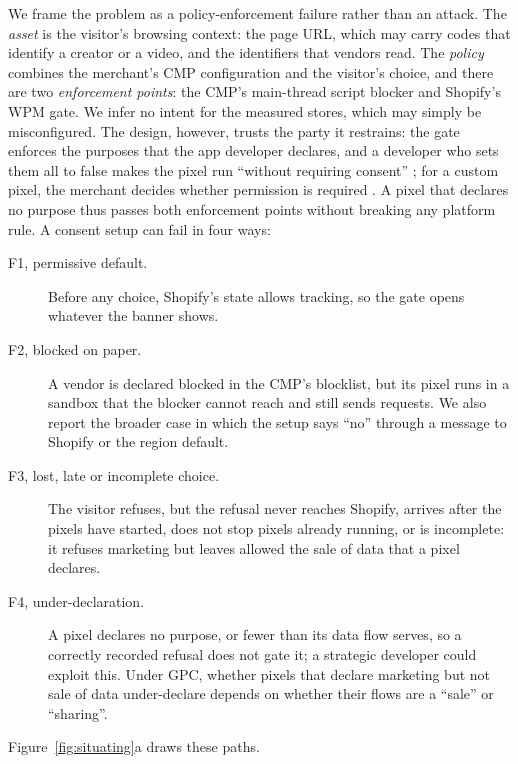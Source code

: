 We frame the problem as a policy-enforcement failure rather than an attack. The \emph{asset} is the visitor's browsing context: the page URL, which may carry codes that identify a creator or a video, and the identifiers that vendors read. The \emph{policy} combines the merchant's CMP configuration and the visitor's choice, and there are two \emph{enforcement points}: the CMP's main-thread script blocker and Shopify's WPM gate. We infer no intent for the measured stores, which may simply be misconfigured. The design, however, trusts the party it restrains: the gate enforces the purposes that the app developer declares, and a developer who sets them all to false makes the pixel run ``without requiring consent'' \citep{shopify_buildwebpixels}; for a custom pixel, the merchant decides whether permission is required \citep{shopify_custompixels}. A pixel that declares no purpose thus passes both enforcement points without breaking any platform rule. A consent setup can fail in four ways:
\begin{description}
  \item[F1, permissive default.] Before any choice, Shopify's state allows tracking, so the gate opens whatever the banner shows.
  \item[F2, blocked on paper.] A vendor is declared blocked in the CMP's blocklist, but its pixel runs in a sandbox that the blocker cannot reach and still sends requests. We also report the broader case in which the setup says ``no'' through a message to Shopify or the region default.
  \item[F3, lost, late or incomplete choice.] The visitor refuses, but the refusal never reaches Shopify, arrives after the pixels have started, does not stop pixels already running, or is incomplete: it refuses marketing but leaves allowed the sale of data that a pixel declares.
  \item[F4, under-declaration.] A pixel declares no purpose, or fewer than its data flow serves, so a correctly recorded refusal does not gate it; a strategic developer could exploit this. Under GPC, whether pixels that declare marketing but not sale of data under-declare depends on whether their flows are a ``sale'' or ``sharing''.
\end{description}
Figure~\ref{fig:situating}a draws these paths.
